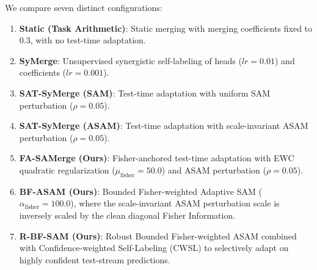 \documentclass{article}
\theoremstyle{plain}
\theoremstyle{definition}
\theoremstyle{remark}
\begin{document}
We compare seven distinct configurations:
\begin{enumerate}
    \item \textbf{Static (Task Arithmetic)}: Static merging with merging coefficients fixed to 0.3, with no test-time adaptation.
    \item \textbf{SyMerge}: Unsupervised synergistic self-labeling of heads ($lr=0.01$) and coefficients ($lr=0.001$).
    \item \textbf{SAT-SyMerge (SAM)}: Test-time adaptation with uniform SAM perturbation ($\rho=0.05$).
    \item \textbf{SAT-SyMerge (ASAM)}: Test-time adaptation with scale-invariant ASAM perturbation ($\rho=0.05$).
    \item \textbf{FA-SAMerge (Ours)}: Fisher-anchored test-time adaptation with EWC quadratic regularization ($\mu_{\text{fisher}}=50.0$) and ASAM perturbation ($\rho=0.05$).
    \item \textbf{BF-ASAM (Ours)}: Bounded Fisher-weighted Adaptive SAM ($\alpha_{\text{fisher}}=100.0$), where the scale-invariant ASAM perturbation scale is inversely scaled by the clean diagonal Fisher Information.
    \item \textbf{R-BF-SAM (Ours)}: Robust Bounded Fisher-weighted ASAM combined with Confidence-weighted Self-Labeling (CWSL) to selectively adapt on highly confident test-stream predictions.
\end{enumerate}
\end{document}
